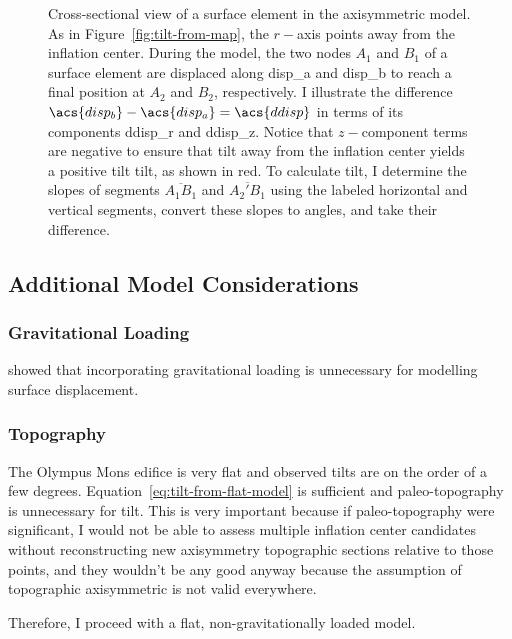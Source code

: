 \begin{figure}
    \caption[\Acl{tilt} from modelling]{Cross-sectional view of a surface element in the axisymmetric model. As in Figure~\ref{fig:tilt-from-map}, the $r-$axis points away from the inflation center. During the model, the two nodes $A_1$ and $B_1$ of a surface element are displaced along \acs{disp_a} and \acs{disp_b} to reach a final position at $A_2$ and $B_2$, respectively. I illustrate the difference $\acs{disp_b} - \acs{disp_a} = \acs{ddisp}$ in terms of its components \acs{ddisp_r} and \acs{ddisp_z}. Notice that $z-$component terms are negative to ensure that tilt away from the inflation center yields a positive tilt \acs{tilt}, as shown in red. To calculate \acs{tilt}, I determine the slopes of segments $\overline{A_1B_1}$ and $\overline{A_2'B_1}$ using the labeled horizontal and vertical segments, convert these slopes to angles, and take their difference.}%
    \label{fig:tilt-from-model}%
\end{figure}

\subsection{Additional Model Considerations}


\subsubsection{Gravitational Loading}

\textcite{grosfils_magma_2007} showed that incorporating gravitational loading is unnecessary for modelling surface displacement.

\subsubsection{Topography}

The Olympus Mons edifice is very flat and observed tilts are on the order of a few degrees. Equation~\eqref{eq:tilt-from-flat-model} is sufficient and paleo-topography is unnecessary for tilt. This is very important because if paleo-topography were significant, I would not be able to assess multiple inflation center candidates without reconstructing new axisymmetry topographic sections relative to those points, and they wouldn't be any good anyway because the assumption of topographic axisymmetric is not valid everywhere.

Therefore, I proceed with a flat, non-gravitationally loaded model.

